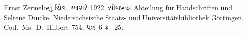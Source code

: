 Ernst Zermeloનું ચિત્ર, આશરે 1922. સૌજન્ય
\href{http://www.sub.uni-goettingen.de/en/contact/departments-a-z/departmental-and-unit-details/abteilunggruppe/handschriften-und-seltene-drucke/}{Abteilung
f\"ur Handschriften und Seltene Drucke, Nieders\"achsische Staats- und
Universit\"atsbibliothek G\"ottingen}. Cod.~Ms.~D.~Hilbert~754, પત્ર~6 ક્ર.~25.
